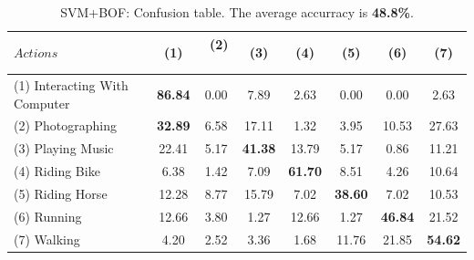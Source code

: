 \documentclass[10pt,a4paper]{llncs}
\begin{document}
\begin{table}[H]
\centering
\caption{SVM+BOF: Confusion table. The average accurracy is \textbf{48.8\%}.}
\label{table:SVM_BOF:Accuracy}
\begin{tabular}{|l|c|c|c|c|c|c|c|}
\hline
$Actions $ & $~~$(1)$~~$ & $~~$(2)$~~$ & $~~$(3)$~~$ & $~~$(4)$~~$ & $~~$(5)$~~$ & $~~$(6)$~~$ & $~~$(7)$~~$\\ \hline
(1) Interacting With Computer & \cellcolor{lightgray}\textbf{86.84} & 0.00 & 7.89 & 2.63 & 0.00 & 0.00 & 2.63 \\ \hline
(2) Photographing             & \cellcolor{lightgray}\textbf{32.89} & 6.58 & 17.11 & 1.32 & 3.95 & 10.53 & 27.63 \\ \hline
(3) Playing Music             & 22.41 & 5.17 & \cellcolor{lightgray}\textbf{41.38} & 13.79 & 5.17 & 0.86 & 11.21 \\ \hline
(4) Riding Bike               & 6.38 & 1.42 & 7.09 & \cellcolor{lightgray}\textbf{61.70} & 8.51 & 4.26 & 10.64 \\ \hline
(5) Riding Horse              & 12.28 & 8.77 & 15.79 & 7.02 & \cellcolor{lightgray}\textbf{38.60} & 7.02 & 10.53 \\ \hline
(6) Running                   & 12.66 & 3.80 & 1.27 & 12.66 & 1.27 & \cellcolor{lightgray}\textbf{46.84} & 21.52 \\ \hline
(7) Walking                   & 4.20 & 2.52 & 3.36 & 1.68 & 11.76 & 21.85 & \cellcolor{lightgray}\textbf{54.62} \\ \hline
\end{tabular}
\end{table}
\end{document}
